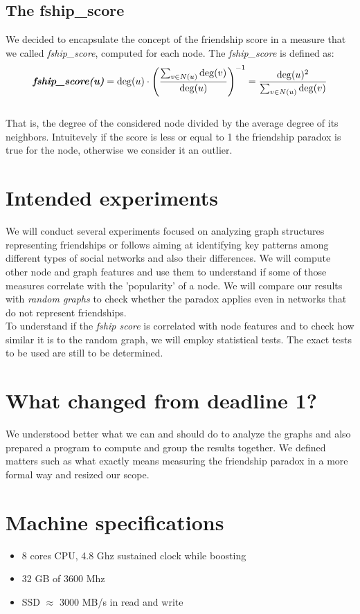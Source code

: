 \documentclass{article}
\begin{document}
\subsection{The fship\_score}
We decided to encapsulate the concept of the friendship score in a measure that we called \textit{fship\_score}, computed for each node. 
The \textit{fship\_score} is defined as:
\\\[
\textit{\textbf{fship\_score(u)}} = \deg(u) \cdot \left( \frac{\sum_{v \in N(u)} \deg(v)}{\deg(u)} \right)^{-1} =
\frac{\deg(u)^{2}}{\sum_{v \in N(u)} \deg(v)}
\]\\
That is, the degree of the considered node divided by the average degree of its neighbors. Intuitevely if the score is less or equal to 1 the friendship paradox is true for the node, otherwise we consider it an outlier.


\section{Intended experiments}
We will conduct several experiments focused on analyzing graph structures representing friendships or follows aiming at identifying key patterns among different types of social networks and also their differences.
We will compute other node and graph features and use them to understand if some of those measures correlate with the 'popularity' of a node.
We will compare our results with \textit{random graphs} to check whether the paradox applies even in networks that do not represent friendships. \\
To understand if the \textit{fship score} is correlated with node features and to check how similar it is to the random graph, we will employ statistical tests. The exact tests to be used are still to be determined.

\section{What changed from deadline 1?}
We understood better what we can and should do to analyze the graphs and also prepared a program to compute and group the results 
together. We defined matters such as what exactly means measuring the friendship paradox in a more formal way and resized our scope.

\section{Machine specifications}
\begin{itemize}
    \item 8 cores CPU, 4.8 Ghz sustained clock while boosting
    \item 32 GB of 3600 Mhz 
    \item SSD $\approx$ 3000 MB/s in read and write
\end{itemize}
\end{document}
